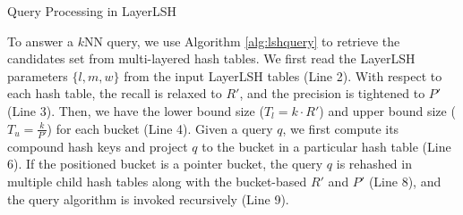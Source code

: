 \begin{algorithm}[t]
\SetNoFillComment
{}

\BlankLine
{}
\caption{Query Processing in LayerLSH}
\label{alg:lshquery}
\end{algorithm}

To answer a $k$NN query, we use Algorithm \ref{alg:lshquery} to retrieve the candidates set from multi-layered hash tables. We first read the LayerLSH parameters $\{l,m,w\}$ from the input LayerLSH tables (Line 2). With respect to each hash table, the recall is relaxed to $R'$, and the precision is tightened to $P'$ (Line 3). Then, we have the lower bound size ($T_l=k\cdot R'$) and upper bound size ($T_u=\frac{k}{P'}$) for each bucket (Line 4). Given a query $q$, we first compute its compound hash keys and project $q$ to the bucket in a particular hash table (Line 6). If the positioned bucket is a pointer bucket, the query $q$ is rehashed in multiple child hash tables along with the bucket-based $R'$ and $P'$ (Line 8), and the query algorithm is invoked recursively (Line 9).


